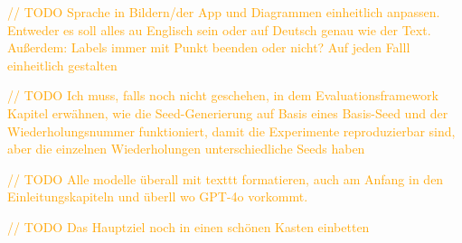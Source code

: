 \textcolor{orange}{// TODO Sprache in Bildern/der App und Diagrammen einheitlich anpassen. Entweder es soll alles au Englisch sein oder auf Deutsch genau wie der Text. Außerdem: Labels immer mit Punkt beenden oder nicht? Auf jeden Falll einheitlich gestalten}

\textcolor{orange}{// TODO Ich muss, falls noch nicht geschehen, in dem Evaluationsframework Kapitel erwähnen, wie die Seed-Generierung auf Basis eines Basis-Seed und der Wiederholungsnummer funktioniert, damit die Experimente reproduzierbar sind, aber die einzelnen Wiederholungen unterschiedliche Seeds haben}

\textcolor{orange}{// TODO Alle modelle überall mit texttt formatieren, auch am Anfang in den Einleitungskapiteln und überll wo GPT-4o vorkommt.}

\textcolor{orange}{// TODO Das Hauptziel noch in einen schönen Kasten einbetten}












